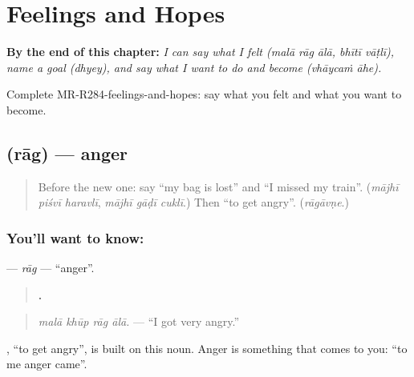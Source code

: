
\chapter{Feelings and Hopes}
\label{ch:mr-feelings-and-hopes}

\begin{chapteropening}
\textbf{By the end of this chapter:} \emph{I can say what I felt (malā rāg ālā, bhītī vāṭlī), name a goal (dhyey), and say what I want to do and become (vhāycaṁ āhe).}

Complete MR-R284-feelings-and-hopes: say what you felt and what you want to become.
\end{chapteropening}

\section[\texorpdfstring{\mr{राग} (rāg)}{राग (rāg)}]{ (rāg) — anger}

\label{lesson:MR-C284-rag}



\begin{quote}
Before the new one: say \textquotedblleft{}my bag is lost\textquotedblright{} and \textquotedblleft{}I missed my train\textquotedblright{}. (\emph{mājhī piśvī haravlī}, \emph{mājhī gāḍī cuklī}.) Then \textquotedblleft{}to get angry\textquotedblright{}. (\emph{rāgāvṇe}.)
\end{quote}

\subsection*{You'll want to know: }
\textbf{} — \emph{rāg} — \textquotedblleft{}anger\textquotedblright{}.

\begin{quote}
\textbf{   .}
\end{quote}

\begin{quote}
\emph{malā khūp rāg ālā.} — \textquotedblleft{}I got very angry.\textquotedblright{}
\end{quote}

\textbf{}, \textquotedblleft{}to get angry\textquotedblright{}, is built on this noun. Anger is something that comes to you: \textquotedblleft{}to me anger came\textquotedblright{}.


